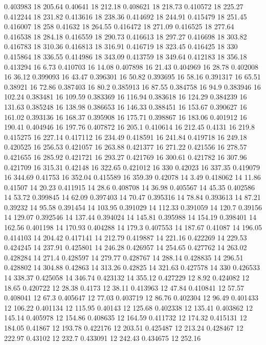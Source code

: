 0.403983 18 205.64
0.40641 18 212.18
0.408621 18 218.73
0.410572 18 225.27
0.412244 18 231.82
0.413616 18 238.36
0.414692 18 244.91
0.415479 18 251.45
0.416007 18 258
0.41632 18 264.55
0.416472 18 271.09
0.416525 18 277.64
0.416538 18 284.18
0.416559 18 290.73
0.416613 18 297.27
0.416698 18 303.82
0.416783 18 310.36
0.416813 18 316.91
0.416719 18 323.45
0.416425 18 330
0.415864 18 336.55
0.414986 18 343.09
0.413759 18 349.64
0.412183 18 356.18
0.413294 16 6.73
0.410703 16 14.08
0.407898 16 21.43
0.404969 16 28.78
0.402008 16 36.12
0.399093 16 43.47
0.396301 16 50.82
0.393695 16 58.16
0.391317 16 65.51
0.38921 16 72.86
0.387403 16 80.2
0.385913 16 87.55
0.384758 16 94.9
0.383946 16 102.24
0.383481 16 109.59
0.383369 16 116.94
0.383618 16 124.29
0.384239 16 131.63
0.385248 16 138.98
0.386653 16 146.33
0.388451 16 153.67
0.390627 16 161.02
0.393136 16 168.37
0.395908 16 175.71
0.398867 16 183.06
0.401912 16 190.41
0.404946 16 197.76
0.407872 16 205.1
0.410614 16 212.45
0.4131 16 219.8
0.415275 16 227.14
0.417112 16 234.49
0.418591 16 241.84
0.419718 16 249.18
0.420525 16 256.53
0.421057 16 263.88
0.421377 16 271.22
0.421556 16 278.57
0.421655 16 285.92
0.421721 16 293.27
0.421769 16 300.61
0.421782 16 307.96
0.421709 16 315.31
0.42148 16 322.65
0.421012 16 330
0.42023 16 337.35
0.419079 16 344.69
0.41753 16 352.04
0.415589 16 359.39
0.42078 14 3.49
0.418062 14 11.86
0.41507 14 20.23
0.411915 14 28.6
0.408708 14 36.98
0.405567 14 45.35
0.402586 14 53.72
0.399845 14 62.09
0.397403 14 70.47
0.395316 14 78.84
0.393613 14 87.21
0.39232 14 95.58
0.391454 14 103.95
0.391029 14 112.33
0.391059 14 120.7
0.39156 14 129.07
0.392546 14 137.44
0.394024 14 145.81
0.395988 14 154.19
0.398401 14 162.56
0.401198 14 170.93
0.404288 14 179.3
0.407553 14 187.67
0.41087 14 196.05
0.414103 14 204.42
0.417141 14 212.79
0.419887 14 221.16
0.422269 14 229.53
0.424245 14 237.91
0.425801 14 246.28
0.426957 14 254.65
0.427762 14 263.02
0.428284 14 271.4
0.428597 14 279.77
0.428767 14 288.14
0.428835 14 296.51
0.428802 14 304.88
0.42863 14 313.26
0.42825 14 321.63
0.427578 14 330
0.426533 14 338.37
0.425058 14 346.74
0.423132 14 355.12
0.427229 12 8.92
0.424082 12 18.65
0.420722 12 28.38
0.4173 12 38.11
0.413963 12 47.84
0.410841 12 57.57
0.408041 12 67.3
0.405647 12 77.03
0.403719 12 86.76
0.402304 12 96.49
0.401433 12 106.22
0.401134 12 115.95
0.40143 12 125.68
0.402338 12 135.41
0.403862 12 145.14
0.405978 12 154.86
0.408635 12 164.59
0.411732 12 174.32
0.415131 12 184.05
0.41867 12 193.78
0.422176 12 203.51
0.425487 12 213.24
0.428467 12 222.97
0.43102 12 232.7
0.433091 12 242.43
0.434675 12 252.16
